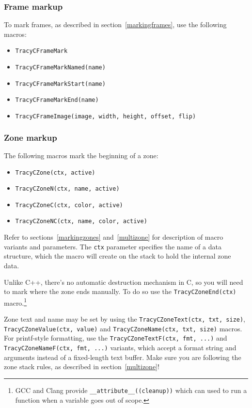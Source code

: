 \documentclass[hidelinks,titlepage,a4paper,twoside]{article}
\begin{document}
\subsubsection{Frame markup}

To mark frames, as described in section~\ref{markingframes}, use the following macros:

\begin{itemize}
\item \texttt{TracyCFrameMark}
\item \texttt{TracyCFrameMarkNamed(name)}
\item \texttt{TracyCFrameMarkStart(name)}
\item \texttt{TracyCFrameMarkEnd(name)}
\item \texttt{TracyCFrameImage(image, width, height, offset, flip)}
\end{itemize}

\subsubsection{Zone markup}
\label{czonemarkup}

The following macros mark the beginning of a zone:

\begin{itemize}
\item \texttt{TracyCZone(ctx, active)}
\item \texttt{TracyCZoneN(ctx, name, active)}
\item \texttt{TracyCZoneC(ctx, color, active)}
\item \texttt{TracyCZoneNC(ctx, name, color, active)}
\end{itemize}

Refer to sections~\ref{markingzones} and~\ref{multizone} for description of macro variants and parameters. The \texttt{ctx} parameter specifies the name of a data structure, which the macro will create on the stack to hold the internal zone data.

Unlike C++, there's no automatic destruction mechanism in C, so you will need to mark where the zone ends manually. To do so use the \texttt{TracyCZoneEnd(ctx)} macro.\footnote{GCC and Clang provide \texttt{\_\_attribute\_\_((cleanup))} which can used to run a function when a variable goes out of scope.}

Zone text and name may be set by using the \texttt{TracyCZoneText(ctx, txt, size)}, \texttt{TracyCZoneValue(ctx, value)} and \texttt{TracyCZoneName(ctx, txt, size)} macros. For printf-style formatting, use the \texttt{TracyCZoneTextF(ctx, fmt, ...)} and \texttt{TracyCZoneNameF(ctx, fmt, ...)} variants, which accept a format string and arguments instead of a fixed-length text buffer. Make sure you are following the zone stack rules, as described in section~\ref{multizone}!
\end{document}
